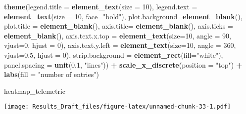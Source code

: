 \documentclass[
]{article}
\newenvironment{Shaded}{\begin{snugshade}}{\end{snugshade}}
\newcommand{\DataTypeTok}[1]{\textcolor[rgb]{0.13,0.29,0.53}{#1}}
\newcommand{\DecValTok}[1]{\textcolor[rgb]{0.00,0.00,0.81}{#1}}
\newcommand{\FloatTok}[1]{\textcolor[rgb]{0.00,0.00,0.81}{#1}}
\newcommand{\KeywordTok}[1]{\textcolor[rgb]{0.13,0.29,0.53}{\textbf{#1}}}
\newcommand{\NormalTok}[1]{#1}
\newcommand{\OperatorTok}[1]{\textcolor[rgb]{0.81,0.36,0.00}{\textbf{#1}}}
\newcommand{\StringTok}[1]{\textcolor[rgb]{0.31,0.60,0.02}{#1}}
\begin{document}
\begin{Shaded}
\begin{Highlighting}[]
\StringTok{                      }\KeywordTok{theme}\NormalTok{(}\DataTypeTok{legend.title =} \KeywordTok{element_text}\NormalTok{(}\DataTypeTok{size =} \DecValTok{10}\NormalTok{),}
                      \DataTypeTok{legend.text =} \KeywordTok{element_text}\NormalTok{(}\DataTypeTok{size =} \DecValTok{10}\NormalTok{, }\DataTypeTok{face=}\StringTok{"bold"}\NormalTok{),}
                      \DataTypeTok{plot.background=}\KeywordTok{element_blank}\NormalTok{(),}
                      \DataTypeTok{plot.title =} \KeywordTok{element_blank}\NormalTok{(),}
                      \DataTypeTok{axis.title=} \KeywordTok{element_blank}\NormalTok{(),}
                      \DataTypeTok{axis.ticks =} \KeywordTok{element_blank}\NormalTok{(),}
                      \DataTypeTok{axis.text.x.top =} \KeywordTok{element_text}\NormalTok{(}\DataTypeTok{size=}\DecValTok{10}\NormalTok{, }\DataTypeTok{angle =} \DecValTok{90}\NormalTok{, }\DataTypeTok{vjust=}\DecValTok{0}\NormalTok{,}
                                                     \DataTypeTok{hjust =} \DecValTok{0}\NormalTok{),}
                      \DataTypeTok{axis.text.y.left =} \KeywordTok{element_text}\NormalTok{(}\DataTypeTok{size=}\DecValTok{10}\NormalTok{, }\DataTypeTok{angle =} \DecValTok{360}\NormalTok{, }\DataTypeTok{vjust=}\FloatTok{0.5}\NormalTok{,}
                                                      \DataTypeTok{hjust =} \DecValTok{0}\NormalTok{),}
                      \DataTypeTok{strip.background =} \KeywordTok{element_rect}\NormalTok{(}\DataTypeTok{fill=}\StringTok{"white"}\NormalTok{),}
                      \DataTypeTok{panel.spacing =} \KeywordTok{unit}\NormalTok{(}\FloatTok{0.1}\NormalTok{, }\StringTok{"lines"}\NormalTok{)) }\OperatorTok{+}
\StringTok{                      }\KeywordTok{scale_x_discrete}\NormalTok{(}\DataTypeTok{position =} \StringTok{"top"}\NormalTok{) }\OperatorTok{+}
\StringTok{                      }\KeywordTok{labs}\NormalTok{(}\DataTypeTok{fill =} \StringTok{"number of entries"}\NormalTok{)}

\NormalTok{heatmap_telemetric}
\end{Highlighting}
\end{Shaded}

\texttt{[image: Results\_Draft\_files/figure-latex/unnamed-chunk-33-1.pdf]}
\end{document}

